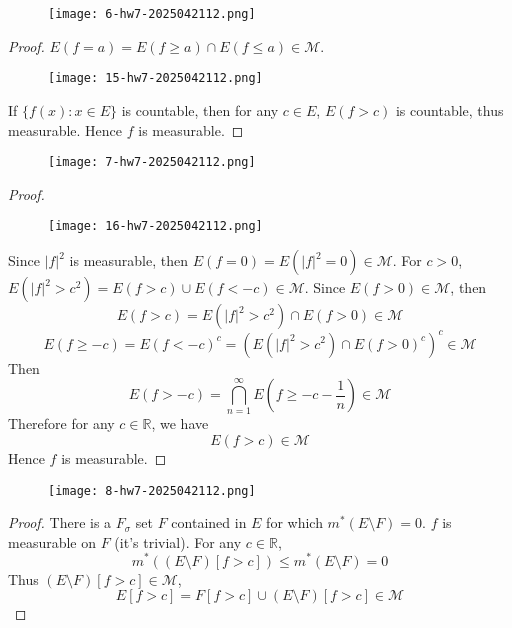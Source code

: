 \begin{exercise}
\begin{figure}[H]
\centering
\texttt{[image: 6-hw7-2025042112.png]}
\label{}
\end{figure}
\end{exercise}
\begin{proof}
$E (f=a)=E (f\geq a)\cap E (f\leq a)\in \mathcal{M}$.
\begin{figure}[H]
\centering
\texttt{[image: 15-hw7-2025042112.png]}
\label{}
\end{figure}
If $\{ f(x):x\in E \}$ is countable, then for any $c\in E$, $E(f>c)$ is countable, thus measurable. Hence $f$ is measurable.
\end{proof}

\begin{exercise}
\begin{figure}[H]
\centering
\texttt{[image: 7-hw7-2025042112.png]}
\label{}
\end{figure}
\end{exercise}
\begin{proof}
\begin{figure}[H]
\centering
\texttt{[image: 16-hw7-2025042112.png]}
\label{}
\end{figure}
Since $\lvert f \rvert ^2$ is measurable, then $E (f=0)=E (\lvert f \rvert ^2=0)\in \mathcal{M}$. For $c>0$, $E (\lvert f \rvert ^2>c^2)=E (f>c)\cup E (f<-c)\in \mathcal{M}$. Since $E (f>0)\in \mathcal{M}$, then
\[
E(f>c)=E(\lvert f \rvert ^2>c^2)\cap E(f>0)\in \mathcal{M}
\]
\[
E(f\geq -c)=E(f<-c)^{c}=(E(\lvert f \rvert ^2>c^2)\cap E(f>0)^{c})^{c}\in \mathcal{M}
\]
Then
\[
E(f>-c)=\bigcap_{n=1}^{\infty} E\left( f\geq -c-\frac{1}{n} \right)\in \mathcal{M}
\]
Therefore for any $c\in \mathbb{R}$, we have
\[
E(f>c)\in \mathcal{M}
\]
Hence $f$ is measurable.
\end{proof}

\begin{exercise}
\begin{figure}[H]
\centering
\texttt{[image: 8-hw7-2025042112.png]}
\label{}
\end{figure}
\end{exercise}
\begin{proof}
There is a $F_{\sigma}$ set $F$ contained in $E$ for which $m^{*}(E\setminus F)=0$. $f$ is measurable on $F$ (it's trivial). For any $c\in \mathbb{R}$,
\[
m^{*}((E\setminus F)[f>c])\leq m^{*}(E\setminus F)=0 
\]
Thus $(E\setminus F)[f>c]\in \mathcal{M}$,
\[
E[f>c]=F[f>c]\cup(E\setminus F)[f>c]\in\mathcal{M}
\]
\end{proof}

